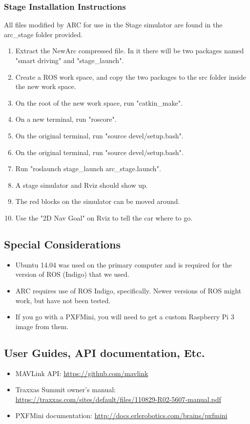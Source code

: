 \documentclass[compsoc,draftclsnofoot,onecolumn,10pt]{IEEEtran}
\begin{document}
\subsubsection{Stage Installation Instructions}
All files modified by ARC for use in the Stage simulator are found in the arc\_stage folder provided.
\begin{enumerate}
    \item Extract the NewArc compressed file. In it there will be two packages named "smart driving" and "stage\_launch".
    \item Create a ROS work space, and copy the two packages to the src folder inside the new work space.
    \item On the root of the new work space, run "catkin\_make".
    \item On a new terminal, run "roscore".
    \item On the original terminal, run "source devel/setup.bash".
    \item On the original terminal, run "source devel/setup.bash".
    \item Run "roslaunch stage\_launch arc\_stage.launch".
    \item A stage simulator and Rviz should show up.
    \item The red blocks on the simulator can be moved around.
    \item Use the "2D Nav Goal" on Rviz to tell the car where to go.
\end{enumerate}


\subsection{Special Considerations}
\begin{itemize}
    \item Ubuntu 14.04 was used on the primary computer and is required for the version of ROS (Indigo) that we used.
    \item ARC requires use of ROS Indigo, specifically. Newer versions of ROS might work, but have not been tested.
    \item If you go with a PXFMini, you will need to get a custom Raspberry Pi 3 image from them.
\end{itemize}

\subsection{User Guides, API documentation, Etc.}
\begin{itemize}
    \item MAVLink API: \href{https://github.com/mavlink}{https://github.com/mavlink}
    \item Traxxas Summit owner's manual: \href{https://traxxas.com/sites/default/files/110829-R02-5607-manual.pdf}{https://traxxas.com/sites/default/files/110829-R02-5607-manual.pdf}
    \item PXFMini documentation: \href{http://docs.erlerobotics.com/brains/pxfmini}{http://docs.erlerobotics.com/brains/pxfmini}
\end{itemize}
\end{document}
